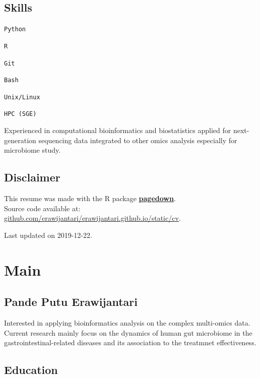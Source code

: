 \documentclass[]{article}
\begin{document}
\hypertarget{skills}{%
\subsection{Skills}\label{skills}}

 \texttt{Python}

 \texttt{R}

 \texttt{Git}

 \texttt{Bash}

 \texttt{Unix/Linux}

 \texttt{HPC\ (SGE)}

Experienced in computational bioinformatics and biostatistics applied
for next-generation sequencing data integrated to other omics analysis
especially for microbiome study.

\hypertarget{disclaimer}{%
\subsection{Disclaimer}\label{disclaimer}}

This resume was made with the R package
\href{https://github.com/rstudio/pagedown}{\textbf{pagedown}}.\\

Source code available at:
\href{https://github.com/danangcrysnanto/cv}{github.com/erawijantari/erawijantari.github.io/static/cv}.

Last updated on 2019-12-22.

\hypertarget{main}{%
\section{Main}\label{main}}

\hypertarget{title}{%
\subsection{Pande Putu Erawijantari}\label{title}}

 Interested in applying bioinformatics analysis on the complex
multi-omics data. Current research mainly focus on the dynamics of human
gut microbiome in the gastrointestinal-related diseases and its
association to the treatmnet effectiveness.\\

\hypertarget{education}{%
\subsection{Education}\label{education}}
\end{document}
